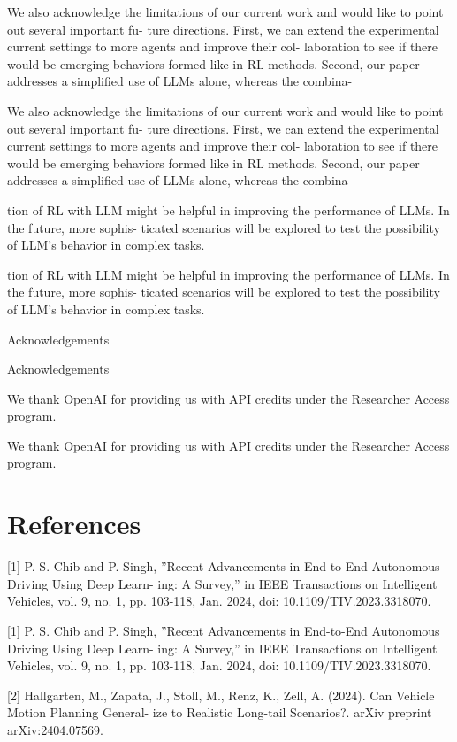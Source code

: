 \documentclass[12pt]{article}
\begin{document}
We also acknowledge the limitations of our current
work and would like to point out several important fu-
ture directions. First, we can extend the experimental
current settings to more agents and improve their col-
laboration to see if there would be emerging behaviors
formed like in RL methods. Second, our paper addresses
a simplified use of LLMs alone, whereas the combina-


We also acknowledge the limitations of our current
work and would like to point out several important fu-
ture directions. First, we can extend the experimental
current settings to more agents and improve their col-
laboration to see if there would be emerging behaviors
formed like in RL methods. Second, our paper addresses
a simplified use of LLMs alone, whereas the combina-


tion of RL with LLM might be helpful in improving
the performance of LLMs. In the future, more sophis-
ticated scenarios will be explored to test the possibility
of LLM’s behavior in complex tasks.


tion of RL with LLM might be helpful in improving
the performance of LLMs. In the future, more sophis-
ticated scenarios will be explored to test the possibility
of LLM’s behavior in complex tasks.


Acknowledgements


Acknowledgements


We thank OpenAI for providing us with API credits
under the Researcher Access program.


We thank OpenAI for providing us with API credits
under the Researcher Access program.


\section{References}


[1] P. S. Chib and P. Singh, ”Recent Advancements in
End-to-End Autonomous Driving Using Deep Learn-
ing: A Survey,” in IEEE Transactions on Intelligent
Vehicles, vol. 9, no. 1, pp. 103-118, Jan. 2024, doi:
10.1109/TIV.2023.3318070.


[1] P. S. Chib and P. Singh, ”Recent Advancements in
End-to-End Autonomous Driving Using Deep Learn-
ing: A Survey,” in IEEE Transactions on Intelligent
Vehicles, vol. 9, no. 1, pp. 103-118, Jan. 2024, doi:
10.1109/TIV.2023.3318070.


[2] Hallgarten, M., Zapata, J., Stoll, M., Renz, K., Zell,
A. (2024). Can Vehicle Motion Planning General-
ize to Realistic Long-tail Scenarios?. arXiv preprint
arXiv:2404.07569.
\end{document}
